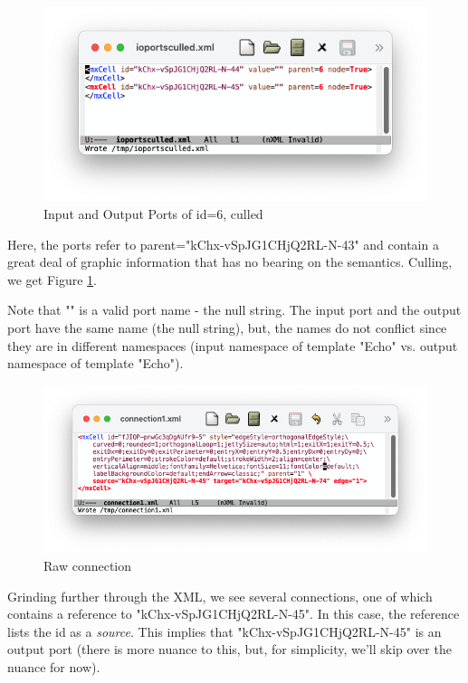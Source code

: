 \documentclass[10pt,anonymous,review]{acmart}
\begin{document}
\begin{figure}
    \includegraphics[scale=0.4]{./media/ioportsculled.png}
    \caption{Input and Output Ports of id=6, culled}
    \label{ioportsculled}
\end{figure}
Here, the ports refer to parent="kChx-vSpJG1CHjQ2RL-N-43" and contain a great deal of graphic information that has no bearing on the semantics.
Culling, we get Figure \ref{ioportsculled}.

Note that "" is a valid port name - the null string. The input port and the output port have the same name (the null string), but, the names do not conflict since they are in different namespaces (input namespace of template "Echo" vs. output namespace of template "Echo").

\begin{figure}
    \includegraphics[scale=0.4]{./media/connection1.png}
    \caption{Raw connection}
    \label{connection}
\end{figure}
Grinding further through the XML, we see several connections, one of which contains a reference to "kChx-vSpJG1CHjQ2RL-N-45". In this case, the reference lists the id as a \emph{source}. This implies that "kChx-vSpJG1CHjQ2RL-N-45" is an output port (there is more nuance to this, but, for simplicity, we'll skip over the nuance for now).
\end{document}
